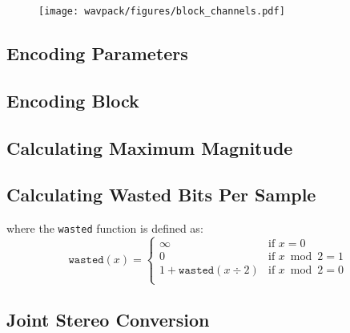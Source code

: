 \begin{figure}[h]
\texttt{[image: wavpack/figures/block\_channels.pdf]}
\end{figure}

\clearpage

\subsection{Encoding Parameters}
\label{wavpack:encoding_parameters}
{
  
}

\clearpage

\subsection{Encoding Block}
\label{wavpack:encode_block}
{
  
}

\clearpage

\subsection{Calculating Maximum Magnitude}
\label{wavpack:calc_maximum_magnitude}
{
  
}

\subsection{Calculating Wasted Bits Per Sample}
\label{wavpack:calc_wasted_bps}
{
  
where the \texttt{wasted} function is defined as:
\begin{equation*}
\texttt{wasted}(x) =
\begin{cases}
\infty & \text{if } x = 0 \\
0 & \text{if } x \bmod 2 = 1 \\
1 + \texttt{wasted}(x \div 2) & \text{if } x \bmod 2 = 0 \\
\end{cases}
\end{equation*}
}

\clearpage

\subsection{Joint Stereo Conversion}
\label{wavpack:calc_joint_stereo}



